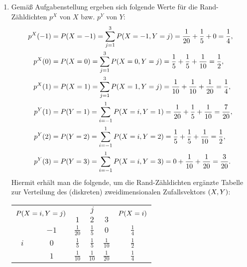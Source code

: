 \documentclass{exercise}
\begin{document}
    \begin{enumerate}
        \item Gemäß Aufgabenstellung ergeben sich folgende Werte für die Rand-Zähldichten \(p^X\) von \(X\) bzw. \(p^Y\) von \(Y\):
        \begin{align*}
            p^X\parentheses*{-1} &= P\parentheses*{X = -1} = \sum_{j = 1}^3 P\parentheses*{X = -1, Y = j} = \frac{1}{20} + \frac{1}{5} + 0 = \frac{1}{4},\\
            p^X\parentheses*{0} &= P\parentheses*{X = 0} = \sum_{j = 1}^3 P\parentheses*{X = 0, Y = j} = \frac{1}{5} + \frac{1}{5} + \frac{1}{10} = \frac{1}{2},\\
            p^X\parentheses*{1} &= P\parentheses*{X = 1} = \sum_{j = 1}^3 P\parentheses*{X = 1, Y = j} = \frac{1}{10} + \frac{1}{10} + \frac{1}{20} = \frac{1}{4},\\
            p^Y\parentheses*{1} &= P\parentheses*{Y = 1} = \sum_{i = -1}^1 P\parentheses*{X = i, Y = 1} = \frac{1}{20} + \frac{1}{5} + \frac{1}{10} = \frac{7}{20},\\
            p^Y\parentheses*{2} &= P\parentheses*{Y = 2} = \sum_{i = -1}^1 P\parentheses*{X = i, Y = 2} = \frac{1}{5} + \frac{1}{5} + \frac{1}{10} = \frac{1}{2},\\
            p^Y\parentheses*{3} &= P\parentheses*{Y = 3} = \sum_{i = -1}^1 P\parentheses*{X = i, Y = 3} = 0 + \frac{1}{10} + \frac{1}{20} = \frac{3}{20}.
        \end{align*}
        Hiermit erhält man die folgende, um die Rand-Zähldichten ergänzte Tabelle zur Verteilung des (diskreten) zweidimensionalen Zufallsvektors \(\parentheses*{X, Y}\):
        \begin{center}
            \begin{tabular}{cccccc}
                \toprule
                \multicolumn{2}{c}{\multirow{2}{*}{\(P\parentheses*{X = i, Y = j}\)}} & \multicolumn{3}{c}{\(j\)} & \multirow{2}{*}{\(P\parentheses*{X = i}\)}\\
                \multicolumn{2}{c}{\multirow{2}{*}{}} & \(1\) & \(2\) & \(3\) & \multirow{2}{*}{}\\
                \midrule
                \multirow{3}{*}{\(i\)} & \(-1\) & \(\frac{1}{20}\) & \(\frac{1}{5}\) & \(0\) & \(\frac{1}{4}\)\\
                & \(0\) & \(\frac{1}{5}\) & \(\frac{1}{5}\) & \(\frac{1}{10}\) & \(\frac{1}{2}\)\\
                & \(1\) & \(\frac{1}{10}\) & \(\frac{1}{10}\) & \(\frac{1}{20}\) & \(\frac{1}{4}\)\\

\end{tabular}
\end{center}
\end{enumerate}
\end{document}

